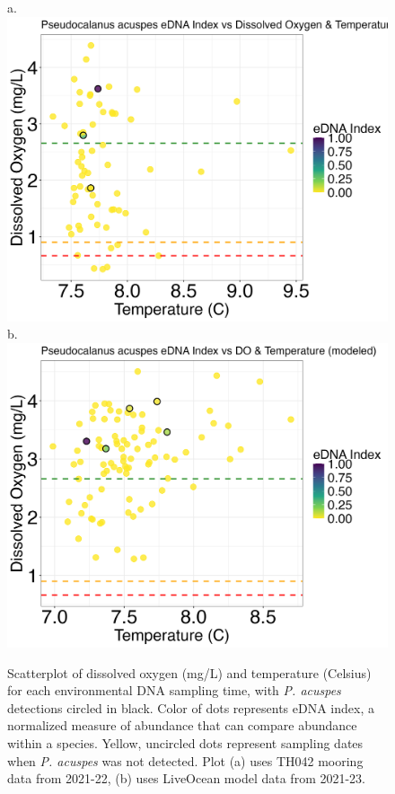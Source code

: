 \documentclass[12pt,twoside]{reedthesis}
\begin{document}
{	\begin{figure}[!h]
		\begin{center}
			a. \includegraphics[scale=0.3]{Pacuspes_Scatter_noOut}
			b. \includegraphics[scale=0.3]{Pacuspes_Scatter_AllYr_mod_noOut}
			\caption[\textit{P. acuspes} scatterplot]{\footnotesize{Scatterplot of dissolved oxygen (mg/L) and temperature (Celsius) for each environmental DNA sampling time, with \textit{P. acuspes} detections circled in black. Color of dots represents eDNA index, a normalized measure of abundance that can compare abundance within a species. Yellow, uncircled dots represent sampling dates when \textit{P. acuspes} was not detected. Plot (a) uses TH042 mooring data from 2021-22, (b) uses LiveOcean model data from 2021-23.}} %
				\label{PacuspesScatter}
		\end{center}
	\end{figure} 
	
}
\end{document}
